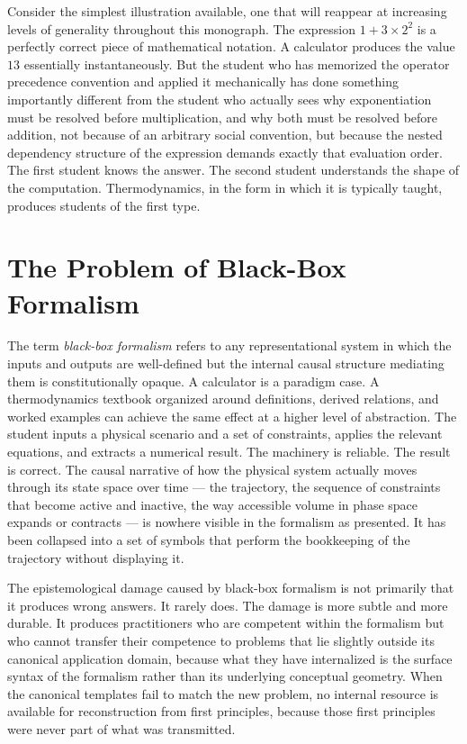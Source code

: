 \documentclass[12pt,openany]{book}
\theoremstyle{plain}
\theoremstyle{definition}
\theoremstyle{remark}
\begin{document}
Consider the simplest illustration available, one that will reappear at increasing levels of generality throughout this monograph. The expression $1 + 3 \times 2^2$ is a perfectly correct piece of mathematical notation. A calculator produces the value $13$ essentially instantaneously. But the student who has memorized the operator precedence convention and applied it mechanically has done something importantly different from the student who actually sees why exponentiation must be resolved before multiplication, and why both must be resolved before addition, not because of an arbitrary social convention, but because the nested dependency structure of the expression demands exactly that evaluation order. The first student knows the answer. The second student understands the shape of the computation. Thermodynamics, in the form in which it is typically taught, produces students of the first type.

\section{The Problem of Black-Box Formalism}

The term \emph{black-box formalism} refers to any representational system in which the inputs and outputs are well-defined but the internal causal structure mediating them is constitutionally opaque. A calculator is a paradigm case. A thermodynamics textbook organized around definitions, derived relations, and worked examples can achieve the same effect at a higher level of abstraction. The student inputs a physical scenario and a set of constraints, applies the relevant equations, and extracts a numerical result. The machinery is reliable. The result is correct. The causal narrative of how the physical system actually moves through its state space over time — the trajectory, the sequence of constraints that become active and inactive, the way accessible volume in phase space expands or contracts — is nowhere visible in the formalism as presented. It has been collapsed into a set of symbols that perform the bookkeeping of the trajectory without displaying it.

The epistemological damage caused by black-box formalism is not primarily that it produces wrong answers. It rarely does. The damage is more subtle and more durable. It produces practitioners who are competent within the formalism but who cannot transfer their competence to problems that lie slightly outside its canonical application domain, because what they have internalized is the surface syntax of the formalism rather than its underlying conceptual geometry. When the canonical templates fail to match the new problem, no internal resource is available for reconstruction from first principles, because those first principles were never part of what was transmitted.
\end{document}
